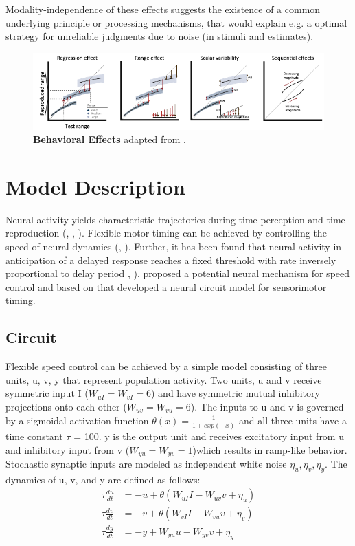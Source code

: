 \documentclass[9pt]{article}
\begin{document}
Modality-independence of these effects suggests the existence of a common underlying principle or processing mechanisms, that would explain e.g. a optimal strategy for unreliable judgments due to noise (in stimuli and estimates).

\begin{figure}[h]
	\centering
	\includegraphics{figures/behavioural_effects_petzschner.pdf}
	\caption{\textbf{Behavioral Effects} adapted from \cite{Petzschner2015}.}
\label{fig:behavioraleffects}
\end{figure}


\section{Model Description}
Neural activity yields characteristic trajectories during time perception and time reproduction (\cite{Meirhaeghe2021}, \cite{Wang2018}, \cite{Henke2021}). 
Flexible motor timing can be achieved by controlling the speed of neural dynamics (\cite{Sohn2019}, \cite{Wang2018}). 
Further, it has been found that neural activity in anticipation of a delayed response reaches a fixed threshold with rate inversely proportional to delay period \cite{Murakami2014}, \cite{Mita2009}).
\cite{Wang2018} proposed a potential neural mechanism for speed control and based on that \cite{Egger2020} developed a neural circuit model for sensorimotor timing.

\subsection{Circuit}
Flexible speed control can be achieved by a simple model consisting of three units, u, v, y that represent population activity. 
Two units, u and v receive symmetric input I ($W_{uI}=W_{vI}=6$) and have symmetric mutual inhibitory projections onto each other ($W_{uv}=W_{vu}=6$). 
The inputs to u and v is governed by a sigmoidal activation function $\theta(x) = \frac{1}{1+exp(-x)}$ and all three units have a time constant $\tau$ = 100. 
y is the output unit and receives excitatory input from u and inhibitory input from v ($W_{yu}=W_{yv}=1$)which results in ramp-like behavior.
Stochastic synaptic inputs are modeled as independent white noise $\eta_u, \eta_v, \eta_y$.
The dynamics of u, v, and y are defined as follows:
\begin{align} \label{circuit}
	\tau\frac{du}{dt} & = -u + \theta(W_{uI}I - W_{uv}v + \eta_u) \\
	\tau\frac{dv}{dt} & = -v + \theta(W_{vI}I - W_{vu}v + \eta_v) \\
	\tau\frac{dy}{dt} & = -y + W_{yu}u - W_{yv}v + \eta_y
	\end{align}
\end{document}
